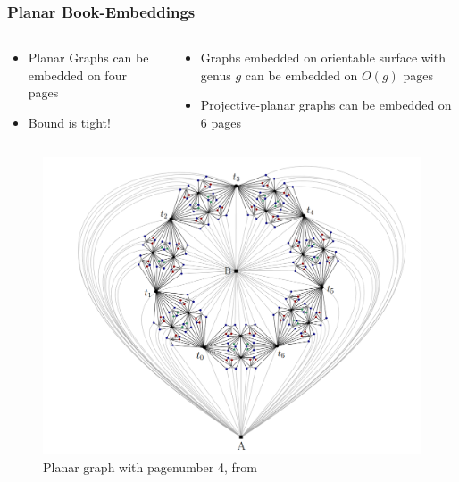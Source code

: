 \documentclass[english]{beamer}
\begin{document}
\begin{frame}
  \frametitle{Planar Book-Embeddings}
  \begin{columns}
    \begin{column}{0.5\textwidth}
      \begin{itemize}
        \item Planar Graphs can be embedded on four pages \cite{yannakakisEmbeddingPlanarGraphs1989}
        \item Bound is tight! \cite{yannakakisPlanarGraphsThat2020,bekosFourPagesAre2020}
      \end{itemize}
    \end{column}
    \begin{column}{0.5\textwidth}
      \begin{itemize}
        \item Graphs embedded on orientable surface with genus $g$ can be embedded on $O(g)$ pages \cite{heathPagenumberGenusGraphs1992}
        \item Projective-planar graphs can be embedded on 6 pages \cite{ozekiBookEmbeddingGraphs2019}
      \end{itemize}
    \end{column}
  \end{columns}
  \begin{figure}
    \centering
    \includegraphics[height = 0.5\textheight]{figures/Screenshot 2024-09-26 152422.png}
    \caption{Planar graph with pagenumber 4, from \cite{bekosFourPagesAre2020}}
  \end{figure}

\end{frame}
\end{document}

